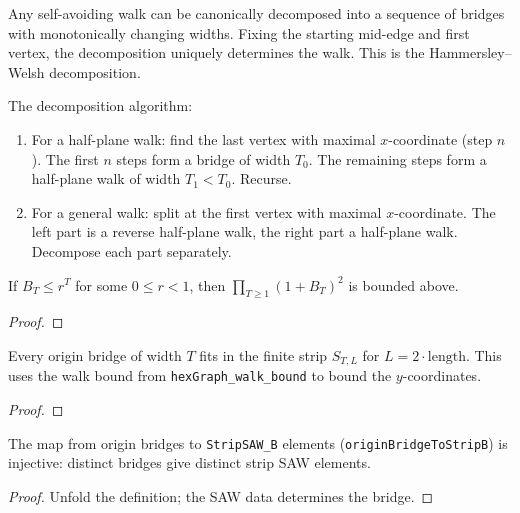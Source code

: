 \begin{definition}\label{def:bridge_decomp}
\leanok
{}
  Any self-avoiding walk can be canonically decomposed into a sequence
  of bridges with monotonically changing widths. Fixing the starting
  mid-edge and first vertex, the decomposition uniquely determines the walk.
  This is the Hammersley--Welsh decomposition.

  The decomposition algorithm:
  \begin{enumerate}
    \item For a half-plane walk: find the last vertex with maximal $x$-coordinate
      (step $n$). The first $n$ steps form a bridge of width $T_0$.
      The remaining steps form a half-plane walk of width $T_1 < T_0$. Recurse.
    \item For a general walk: split at the first vertex with maximal $x$-coordinate.
      The left part is a reverse half-plane walk, the right part a half-plane walk.
      Decompose each part separately.
  \end{enumerate}
\end{definition}

\begin{theorem}\label{thm:hw_upper_abstract}
\leanok
{}
  If $B_T \leq r^T$ for some $0 \leq r < 1$, then
  $\prod_{T \geq 1}(1 + B_T)^2$ is bounded above.
\end{theorem}
\begin{proof}
\leanok
\end{proof}

\begin{theorem}\label{thm:bridge_in_strip}
\leanok
{}
  Every origin bridge of width $T$ fits in the finite strip $S_{T,L}$
  for $L = 2 \cdot \text{length}$. This uses the walk bound from
  \texttt{hexGraph\_walk\_bound} to bound the $y$-coordinates.
\end{theorem}
\begin{proof}
\leanok
\end{proof}

\begin{lemma}\label{lem:bridge_strip_inj}
\leanok
{}
  The map from origin bridges to \texttt{StripSAW\_B} elements
  (\texttt{originBridgeToStripB}) is injective: distinct bridges
  give distinct strip SAW elements.
\end{lemma}
\begin{proof}
\leanok
  Unfold the definition; the SAW data determines the bridge.
\end{proof}

